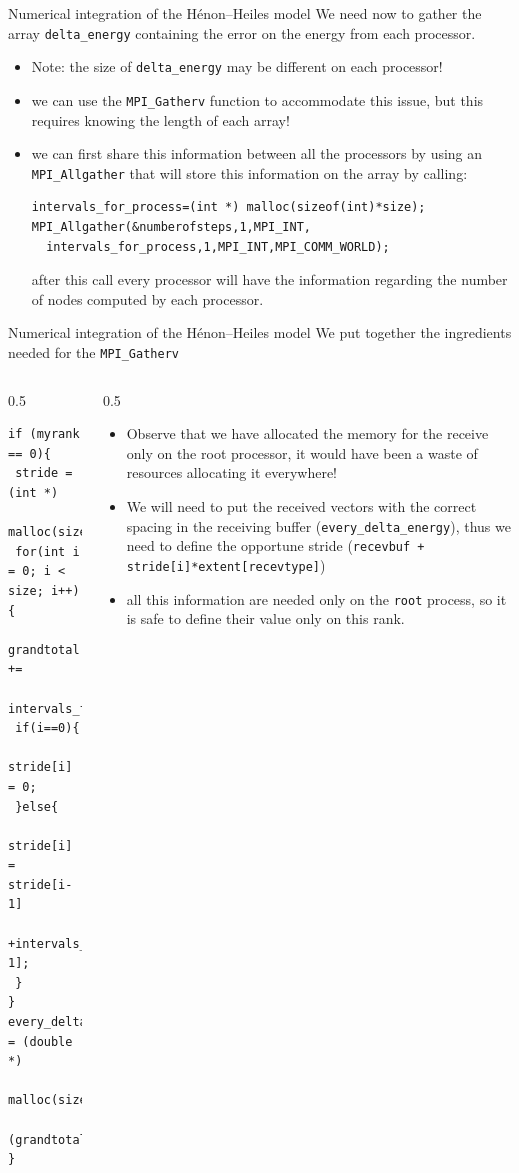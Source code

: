 \documentclass[xcolor={svgnames,usenames}]{beamer}
\begin{document}
\begin{frame}[fragile]{Numerical integration of the H\'enon--Heiles model}
We need now to gather the array \texttt{delta_energy} containing the error on the energy from each processor.
\begin{itemize}
	\item \alert{Note:} the size of \texttt{delta_energy} may be different on each processor!
	\item<2-> we can use the \texttt{MPI_Gatherv} function to accommodate this issue, \alert{but} this requires knowing the length of each array!
	\item<3-> we can first share this information between all the processors by using an \texttt{MPI_Allgather} that will store this information on the array  by calling:
\begin{verbatim}
intervals_for_process=(int *) malloc(sizeof(int)*size);
MPI_Allgather(&numberofsteps,1,MPI_INT,
  intervals_for_process,1,MPI_INT,MPI_COMM_WORLD);
\end{verbatim}
after this call every processor will have the information regarding the number of nodes computed by each processor.
\end{itemize}

\end{frame}

\begin{frame}[fragile]{Numerical integration of the H\'enon--Heiles model}
\small
We put together the ingredients needed for the \texttt{MPI_Gatherv}
\begin{columns}
\begin{column}{0.5\columnwidth}
\begin{verbatim}
if (myrank == 0){
 stride = (int *) 
   malloc(sizeof(int)*size);
 for(int i = 0; i < size; i++){
  grandtotal += 
    intervals_for_process[i];
 if(i==0){
  stride[i] = 0;
 }else{
  stride[i] = stride[i-1]
   +intervals_for_process[i-1];
 }
}
every_delta_energy = (double *) 
 malloc(sizeof(double)*
  (grandtotal+size));
}
\end{verbatim}
\end{column}
\begin{column}{0.5\columnwidth}
\begin{itemize}
	\item Observe that we have allocated the memory for the receive only on the
	root processor, it would have been a waste of resources allocating it everywhere!
	\item We will need to put the received vectors with the correct spacing in the receiving buffer  
	(\texttt{every_delta_energy}), thus we need to define the opportune stride  
	(\texttt{recevbuf +} \texttt{stride[i]*extent[recevtype]})
	\item all this information are needed only on the \texttt{root} process, so it is safe to
	define their value only on this rank.
\end{itemize}
\end{column}
\end{columns}
\end{frame}
\end{document}
